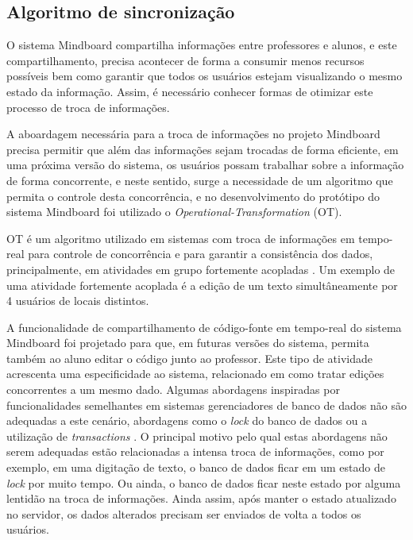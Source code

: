 



\subsection{Algoritmo de sincronização}
\label{sec:alg_ot}

O sistema Mindboard compartilha informações entre professores e alunos, e este compartilhamento, precisa acontecer de forma a consumir menos recursos possíveis bem como garantir que todos os usuários estejam visualizando o mesmo estado da informação. Assim, é necessário conhecer formas de otimizar este processo de troca de informações.

A aboardagem necessária para a troca de informações no projeto Mindboard precisa permitir que além das informações sejam trocadas de forma eficiente, em uma próxima versão do sistema, os usuários possam trabalhar sobre a informação de forma concorrente, e neste sentido, surge a necessidade de um algoritmo que permita o controle desta concorrência, e no desenvolvimento do protótipo do sistema Mindboard foi utilizado o \emph{Operational-Transformation} (OT).

OT é um algoritmo utilizado em sistemas com troca de informações em tempo-real para controle de concorrência e para garantir a consistência dos dados, principalmente, em atividades em grupo fortemente acopladas \cite{ot}. Um exemplo de uma atividade fortemente acoplada é a edição de um texto simultâneamente por 4 usuários de locais distintos.

A funcionalidade de compartilhamento de código-fonte em tempo-real do sistema Mindboard foi projetado para que, em futuras versões do sistema, permita também ao aluno editar o código junto ao professor. Este tipo de atividade acrescenta uma especificidade ao sistema, relacionado em como tratar edições concorrentes a um mesmo dado. Algumas abordagens inspiradas por funcionalidades semelhantes em sistemas gerenciadores de banco de dados não são adequadas a este cenário, abordagens como o \emph{lock} do banco de dados ou a utilização de \emph{transactions} \cite{ot}. O principal motivo pelo qual estas abordagens não serem adequadas estão relacionadas a intensa troca de informações, como por exemplo, em uma digitação de texto, o banco de dados ficar em um estado de \emph{lock} por muito tempo. Ou ainda, o banco de dados ficar neste estado por alguma lentidão na troca de informações. Ainda assim, após manter o estado atualizado no servidor, os dados alterados precisam ser enviados de volta a todos os usuários. 

